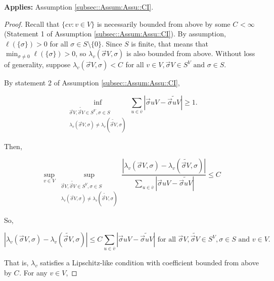 \documentclass[12pt]{article}
\newcommand{\ov}{\overline}
\newcommand{\te}{\text}
\newcommand{\app}{\textbf{Applies: }}
\newcommand{\ind}{\hspace{24pt}}
\renewcommand{\v}{v}							%
\newcommand{\vv}{u}								%
\renewcommand{\S}{S}							%
\newcommand{\s}{\sigma}							%
\newcommand{\sv}{\vec{\s}}						%
\newcommand{\IGr}{c}							%
\newcommand{\cl}{\ov}							%
\newcommand{\V}{V}									%
\newcommand{\XState}[1]{\S^{#1}}				%
\newcommand{\rate}[1]{\lambda_{#1}}					%
\newcommand{\const}[1]{C_{#1}}						%
\newcommand{\Sm}{\ell}								%
\newcommand{\alt}{\widetilde}						%
\begin{document}
\app Assumption \ref{subsec::Assum:Assu::CI}.

\begin{proof}
Recall that \(\{\IGr{\v}:\v\in\V\}\) is necessarily bounded from above by some \(\const{} < \infty\) (Statement 1 of Assumption \ref{subsec::Assum:Assu::CI}). By assumption, \(\Sm(\{\s\}) > 0\) for all \(\s \in \S\setminus \{0\}\). Since \(\S\) is finite, that means that \(\min_{\s \neq 0} \Sm(\{\s\}) > 0\), so \(\rate{\v}(\sv{}{\V},\s)\) is also bounded from above. Without loss of generality, suppose \(\rate{\v}(\sv{}{\V},\s) < \const{}\) for all \(\v\in \V,\sv{}{\V} \in \S^\V\te{ and } \s \in \S\).

\ind By statement 2 of Assumption \ref{subsec::Assum:Assu::CI}, 

\[\inf_{\substack{\sv{}{\V},\alt{\sv{}{\V}} \in \S^\V, \s\in \S\\ \rate{\v}(\sv{}{\V},\s) \neq \rate{\v}(\alt{\sv{}{\V}},\s)}} \sum_{\vv \in \cl{\v}} |\sv{\vv}{\V} - \alt{\sv{\vv}{\V}}| \geq 1.\]

Then,

\[\sup_{\v\in \V} \sup_{\substack{\sv{}{\V},\alt{\sv{}{\V}} \in \S^\V, \s\in \S\\ \rate{\v}(\sv{}{\V},\s) \neq \rate{\v}(\alt{\sv{}{\V}},\s)}} \frac{|\rate{\v}(\sv{}{\V},\s) - \rate{\v}(\alt{\sv{}{\V}},\s)|}{\sum_{\vv \in \cl{\v}} |\sv{\vv}{\V} - \alt{\sv{\vv}{\V}}|} \leq \const{}\]

So,

\[|\rate{\v}(\sv{}{\V},\s) - \rate{\v}(\alt{\sv{}{\V}},\s)|\leq \const{}\sum_{\vv \in \cl{\v}} |\sv{\vv}{\V} - \alt{\sv{\vv}{\V}}| \te{ for all } \sv{}{\V},\alt{\sv{}{\V}}\in \S^\V,\s\in \S\te{ and }\v\in \V.\]

That is, \(\rate{\v}\) satisfies a Lipschitz-like condition with coefficient bounded from above by \(\const{}\). For any \(\v\in \V\),


\end{proof}
\end{document}
